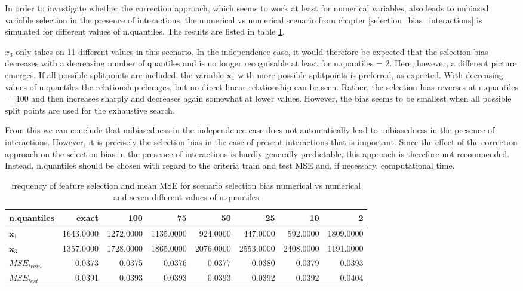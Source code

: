In order to investigate whether the correction approach, which seems to work at least for numerical variables, also leads to unbiased variable selection in the presence of interactions, the numerical vs numerical scenario from chapter \ref{selection_bias_interactions} is simulated for different values of n.quantiles. The results are listed in table \ref{tab:app_selection_bias_interaction}. 

$x_3$ only takes on 11 different values in this scenario. In the independence case, it would therefore be expected that the selection bias decreases with a decreasing number of quantiles and is no longer recognisable at least for n.quantiles = 2. Here, however, a different picture emerges. If all possible splitpoints are included, the variable $\textbf{x}_1$ with more possible splitpoints is preferred, as expected. With decreasing values of n.quantiles the relationship changes, but no direct linear relationship can be seen. Rather, the selection bias reverses at n.quantiles $= 100$ and then increases sharply and decreases again somewhat at lower values. However, the bias seems to be smallest when all possible split points are used for the exhaustive search. 

From this we can conclude that unbiasedness in the independence case does not automatically lead to unbiasedness in the presence of interactions. 
However, it is precisely the selection bias in the case of present interactions that is important. Since the effect of the correction approach on the selection bias in the presence of interactions is hardly generally predictable, this approach is therefore not recommended. Instead, n.quantiles should be chosen with regard to the criteria train and test MSE and, if necessary, computational time.


\begin{table}[!htb]
\centering \footnotesize
\begin{tabular}[t]{l|r|r|r|r|r|r|r}
\hline
n.quantiles  & exact & 100 & 75 & 50 & 25 & 10 & 2\\
\hline
$\textbf{x}_1$ & 1643.0000 & 1272.0000 & 1135.0000 & 924.0000 & 447.0000 & 592.0000 & 1809.0000\\
\hline
$\textbf{x}_3$ & 1357.0000 & 1728.0000 & 1865.0000 & 2076.0000 & 2553.0000 & 2408.0000 & 1191.0000\\
\hline
$MSE_{train}$ & 0.0373 & 0.0375 & 0.0376 & 0.0377 & 0.0380 & 0.0379 & 0.0393\\
\hline
$MSE_{test}$ & 0.0391 & 0.0393 & 0.0393 & 0.0393 & 0.0392 & 0.0392 & 0.0404\\
\hline
\end{tabular}
\caption{frequency of feature selection and mean MSE for scenario selection bias numerical vs numerical and seven different values of n.quantiles}
\label{tab:app_selection_bias_interaction}
\end{table}





